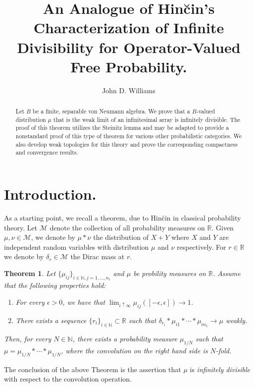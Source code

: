 \documentclass[11pt]{amsart}
\newtheorem{theorem}{Theorem}[section]
\begin{document}
\begin{abstract}
Let $B$ be a finite, separable von Neumann algebra. We prove that a $B$-valued 
distribution $\mu$ that is the weak limit of an infinitesimal array is infinitely divisible.  The proof of this theorem utilizes the 
Steinitz lemma and may be adapted to provide a nonstandard proof of this type of theorem for various other probabilistic categories.  We also develop weak topologies
for this theory and prove the corresponding compactness and convergence results.
\end{abstract}
\address{Texas A\&M University, Dept. of Mathematics, 
\\ Mail Stop 3368 , College Station, TX 77843-3368 
\\jwilliams@math.tamu.edu}
\title[Operator-Valued Infinite Divisibility.]{An Analogue of Hin\u{c}in's Characterization of Infinite Divisibility for Operator-Valued Free Probability.}
\author{John D. Williams}
\maketitle


\section{Introduction.}
As a starting point, we recall a theorem, due to Hin\u{c}in in classical probability theory.
Let $\mathcal{M}$ denote the collection of all probability measures on $\mathbb{R}$.  Given $\mu, \nu \in \mathcal{M}$, 
we denote by $\mu \ast \nu$ the distribution of $X + Y$ where $X$ and $Y$ are independent random variables with
distribution $\mu$ and $\nu$ respectively.  For $r\in \mathbb{R}$ we denote by $\delta_{r}\in \mathcal{M}$ the 
Dirac mass at $r$.
\begin{theorem}\label{classical_H}
Let $\{\mu_{ij} \}_{i\in\mathbb{N},j=1,\ldots,n_{i}}$ and  $\mu$ be probility measures on $\mathbb{R}$.
Assume that the following properties hold:
\begin{enumerate}
\item
For every $\epsilon >0$, we have that $\lim_{i\uparrow \infty} \mu_{ij}([-\epsilon,\epsilon])\rightarrow 1$.
\item
There exists a sequence $\{r_{i} \}_{i\in \mathbb{N}} \subset \mathbb{R}$ such that 
$\delta_{r_{i}}\ast \mu_{i1} \ast \cdots \ast \mu_{in_{1}} \rightarrow \mu$ weakly.
\end{enumerate}
Then, for every $N\in \mathbb{N}$, there exists a probability measure $\mu_{1/N}$ such 
that $\mu = \mu_{1/N} \ast \cdots \ast \mu_{1/N}$, where the convolution on the right hand side is $N$-fold.
\end{theorem}The conclusion of the above Theorem is the assertion that $\mu$ is \textit{infinitely divisible} with respect to 
the convolution operation.
\end{document}
